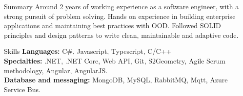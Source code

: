 \documentclass{resume}
\begin{document}

\begin{rSection}{Summary}
Around 2 years of working experience as a software engineer, with a strong pursuit of problem solving.
Hands on experience in building enterprise applications and maintaining best practices with OOD.
Followed SOLID principles and design patterns to write clean, maintainable and adaptive code.
\end{rSection}


\begin{rSection}{Skills}
{\bf Languages:} C\#, Javascript, Typescript, C/C++\\
{\bf Specialties:} .NET, .NET Core, Web API, Git, S2Geometry, Agile Scrum methodology, Angular, AngularJS.\\
{\bf Database and messaging:} MongoDB, MySQL, RabbitMQ, Mqtt, Azure Service Bus.
\end{rSection}

\end{document}
